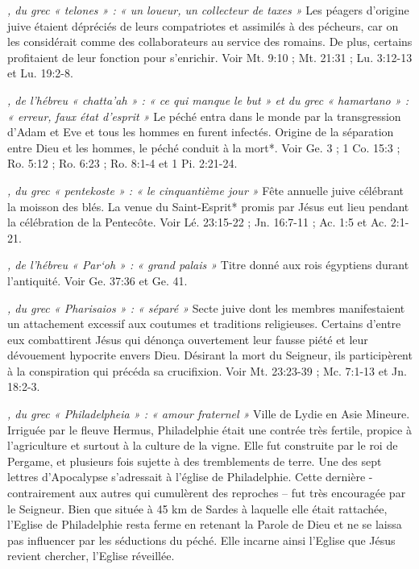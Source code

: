 \begin{multicols}{2}
\textit{, du grec « telones » : « un loueur, un collecteur de taxes »}\newline
Les péagers d'origine juive étaient dépréciés de leurs compatriotes et assimilés à des pécheurs, car on les considérait comme des collaborateurs au service des romains. De plus, certains profitaient de leur fonction pour s'enrichir. Voir Mt. 9:10 ; Mt. 21:31 ; Lu. 3:12-13 et Lu. 19:2-8.

\textit{, de l'hébreu « chatta'ah » : « ce qui manque le but » et du grec « hamartano » : « erreur, faux état d'esprit »}\newline
Le péché entra dans le monde par la transgression d'Adam et Eve et tous les hommes en furent infectés. Origine de la séparation entre Dieu et les hommes, le péché conduit à la mort*. Voir Ge. 3 ; 1 Co. 15:3 ; Ro. 5:12 ; Ro. 6:23 ; Ro. 8:1-4 et 1 Pi. 2:21-24.

\textit{, du grec « pentekoste » : « le cinquantième jour »}\newline
Fête annuelle juive célébrant la moisson des blés. La venue du Saint-Esprit* promis par Jésus eut lieu pendant la célébration de la Pentecôte. Voir Lé. 23:15-22 ; Jn. 16:7-11 ; Ac. 1:5 et Ac. 2:1-21.

\textit{, de l'hébreu « Par`oh » : « grand palais »}\newline
Titre donné aux rois égyptiens durant l'antiquité. Voir Ge. 37:36 et Ge. 41.

\textit{, du grec « Pharisaios » : « séparé »}\newline
Secte juive dont les membres manifestaient un attachement excessif aux coutumes et traditions religieuses. Certains d'entre eux combattirent Jésus qui dénonça ouvertement leur fausse piété et leur dévouement hypocrite envers Dieu. Désirant la mort du Seigneur, ils participèrent à la conspiration qui précéda sa crucifixion. Voir Mt. 23:23-39 ; Mc. 7:1-13 et Jn. 18:2-3.

\textit{, du grec « Philadelpheia » : « amour fraternel »}\newline
Ville de Lydie en Asie Mineure. Irriguée par le fleuve Hermus, Philadelphie était une contrée très fertile, propice à l'agriculture et surtout à la culture de la vigne. Elle fut construite par le roi de Pergame, et plusieurs fois sujette à des tremblements de terre. Une des sept lettres d'Apocalypse s'adressait à l'église de Philadelphie. Cette dernière - contrairement aux autres qui cumulèrent des reproches – fut très encouragée par le Seigneur. Bien que située à 45 km de Sardes à laquelle elle était rattachée, l'Eglise de Philadelphie resta ferme en retenant la Parole de Dieu et ne se laissa pas influencer par les séductions du péché. Elle incarne ainsi l'Eglise que Jésus revient chercher, l'Eglise réveillée.


\end{multicols}
